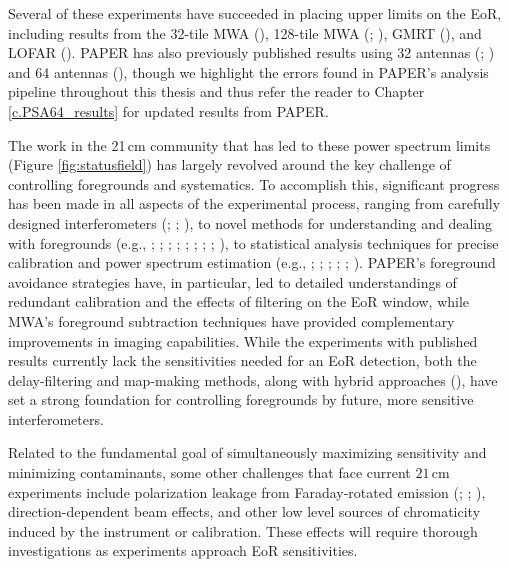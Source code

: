 Several of these experiments have succeeded in placing upper limits on the EoR, including results from the 32-tile MWA (\citealt{dillon_et_al2014}), 128-tile MWA (\citealt{dillon_et_al2015}; \citealt{beardsley_et_al2016}), GMRT (\citealt{paciga_et_al2013}), and LOFAR (\citealt{patil_et_al2017}). PAPER has also previously published results using 32 antennas (\citealt{parsons_et_al2014}; \citealt{jacobs_et_al2015}) and 64 antennas (\citealt{ali_et_al2015}), though we highlight the errors found in PAPER's analysis pipeline throughout this thesis and thus refer the reader to Chapter \ref{c.PSA64_results} for updated results from PAPER.

The work in the 21\,cm community that has led to these power spectrum limits (Figure \ref{fig:statusfield}) has largely revolved around the key challenge of controlling foregrounds and systematics. To accomplish this, significant progress has been made in all aspects of the experimental process, ranging from carefully designed interferometers (\citealt{lonsdale_et_al2009}; \citealt{parsons_et_al2012a}; \citealt{dillon_parsons2016}), to novel methods for understanding and dealing with foregrounds (e.g., \citealt{morales_et_al2006}; \citealt{datta_et_al2010}; \citealt{sullivan_et_al2012}; \citealt{moore_et_al2013}; \citealt{hazelton_et_al2013}; \citealt{pober_et_al2013b}; \citealt{liu_et_al2014a}; \citealt{liu_et_al2014b}; \citealt{Thyagarajan_et_al2015a}), to statistical analysis techniques for precise calibration and power spectrum estimation (e.g., \citealt{liu_et_al2010}; \citealt{trott_et_al2012}; \citealt{liu_et_al2014b}; \citealt{zheng_et_al2014}; \citealt{dillon_et_al2014}; \citealt{jacobs_et_al2016}). PAPER's foreground avoidance strategies have, in particular, led to detailed understandings of redundant calibration and the effects of filtering on the EoR window, while MWA's foreground subtraction techniques have provided complementary improvements in imaging capabilities. While the experiments with published results currently lack the sensitivities needed for an EoR detection, both the delay-filtering and map-making methods, along with hybrid approaches (\citealt{trott_et_al2016}), have set a strong foundation for controlling foregrounds by future, more sensitive interferometers.

Related to the fundamental goal of simultaneously maximizing sensitivity and minimizing contaminants, some other challenges that face current $21$\,cm experiments include polarization leakage from Faraday-rotated emission (\citealt{moore_et_al2013}; \citealt{kohn_et_al2016}; \citealt{nunhokee_et_al2017}), direction-dependent beam effects, and other low level sources of chromaticity induced by the instrument or calibration. These effects will require thorough investigations as experiments approach EoR sensitivities.

